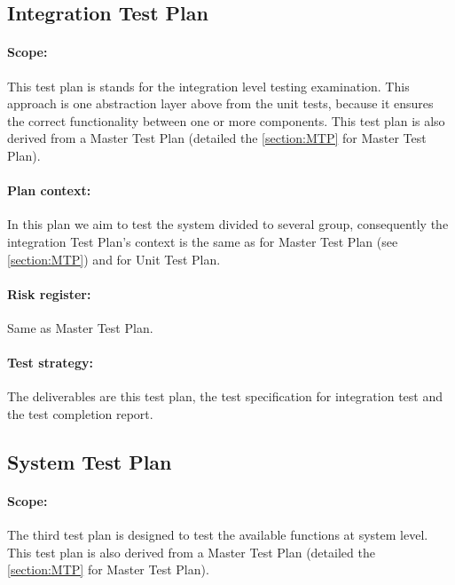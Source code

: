 
\subsection{Integration Test Plan}
\paragraph{Scope:} This test plan is stands for the integration level testing examination. This approach is one abstraction layer above from the unit tests, because it ensures the correct functionality between one or more components. This test plan is also derived from a Master Test Plan (detailed the \autoref{section:MTP} for Master Test Plan).
\paragraph{Plan context:} In this plan we aim to test the system divided to several group, consequently the integration Test Plan's context is the same as for Master Test Plan (see \autoref{section:MTP}) and for Unit Test Plan.
\paragraph{Risk register:} Same as Master Test Plan.
\paragraph{Test strategy:} The deliverables are this test plan, the test specification for integration test and the test completion report. 


\subsection{System Test Plan}
\paragraph{Scope:} The third test plan is designed to test the available functions at system level. This test plan is also derived from a Master Test Plan (detailed the \autoref{section:MTP} for Master Test Plan).
